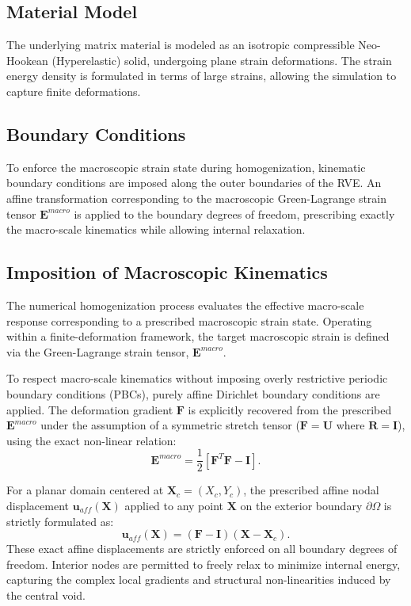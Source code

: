 \documentclass[12pt,a4paper]{article}
\begin{document}
\subsection{Material Model}

The underlying matrix material is modeled as an isotropic compressible Neo-Hookean (Hyperelastic) solid, undergoing plane strain deformations. The strain energy density is formulated in terms of large strains, allowing the simulation to capture finite deformations.

\subsection{Boundary Conditions}

To enforce the macroscopic strain state during homogenization, kinematic boundary conditions are imposed along the outer boundaries of the RVE. An affine transformation corresponding to the macroscopic Green-Lagrange strain tensor $\mathbf{E}^{macro}$ is applied to the boundary degrees of freedom, prescribing exactly the macro-scale kinematics while allowing internal relaxation.

\subsection{Imposition of Macroscopic Kinematics}

The numerical homogenization process evaluates the effective macro-scale response corresponding to a prescribed macroscopic strain state. Operating within a finite-deformation framework, the target macroscopic strain is defined via the Green-Lagrange strain tensor, $\mathbf{E}^{macro}$.

To respect macro-scale kinematics without imposing overly restrictive periodic boundary conditions (PBCs), purely affine Dirichlet boundary conditions are applied. The deformation gradient $\mathbf{F}$ is explicitly recovered from the prescribed $\mathbf{E}^{macro}$ under the assumption of a symmetric stretch tensor ($\mathbf{F} = \mathbf{U}$ where $\mathbf{R} = \mathbf{I}$), using the exact non-linear relation:
\begin{equation}
    \mathbf{E}^{macro} = \frac{1}{2} \left[ \mathbf{F}^T \mathbf{F} - \mathbf{I} \right].
\end{equation}

For a planar domain centered at $\mathbf{X}_c = (X_c, Y_c)$, the prescribed affine nodal displacement $\mathbf{u}_{aff}(\mathbf{X})$ applied to any point $\mathbf{X}$ on the exterior boundary $\partial \Omega$ is strictly formulated as:
\begin{equation}
    \mathbf{u}_{aff}(\mathbf{X}) = (\mathbf{F} - \mathbf{I}) (\mathbf{X} - \mathbf{X}_c).
\end{equation}
These exact affine displacements are strictly enforced on all boundary degrees of freedom. Interior nodes are permitted to freely relax to minimize internal energy, capturing the complex local gradients and structural non-linearities induced by the central void.
\end{document}
